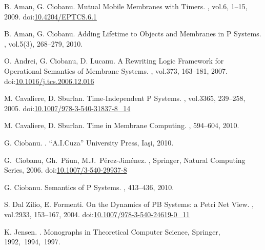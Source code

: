 \documentclass{eptcs}
\begin{document}
\begin{thebibliography}{1}

\providecommand{\urlalt}[2]{\href{#1}{#2}}
\providecommand{\doi}[1]{doi:\urlalt{http://dx.doi.org/#1}{#1}}

B. Aman, G. Ciobanu.
\newblock Mutual Mobile Membranes with Timers.
, vol.6, 1--15, 2009.
\newblock \doi{10.4204/EPTCS.6.1}

B. Aman, G. Ciobanu.
\newblock Adding Lifetime to Objects and Membranes in P Systems.
, vol.5(3), 268--279, 2010.

O. Andrei, G. Ciobanu, D. Lucanu.
\newblock A Rewriting Logic Framework for Operational Semantics of Membrane
Systems.
, vol.373, 163--181, 2007.
\newblock \doi{10.1016/j.tcs.2006.12.016}

M. Cavaliere, D. Sburlan.
\newblock Time-Independent P Systems.
, vol.3365, 239--258, 2005.
\newblock \doi{10.1007/978-3-540-31837-8\_14}

M. Cavaliere, D. Sburlan.
\newblock Time in Membrane Computing.
, 594--604,
2010.

G. Ciobanu.
.
\newblock ``A.I.Cuza'' University Press, Ia\c si, 2010.

G.~Ciobanu, Gh.~P\u aun, M.J.~P\'erez-Jim\'enez.
, Springer, Natural
Computing Series, 2006.
\newblock \doi{10.1007/3-540-29937-8}

G. Ciobanu.
\newblock Semantics of P Systems.
, 413--436, 2010.

S. Dal Zilio, E. Formenti.
\newblock On the Dynamics of PB Systems: a Petri Net View.
, vol.2933,
153--167, 2004.
\newblock \doi{10.1007/978-3-540-24619-0\_11}

K. Jensen.
.
\newblock Monographs in Theoretical Computer Science, Springer,
1992,~1994,~1997.


\end{thebibliography}
\end{document}
